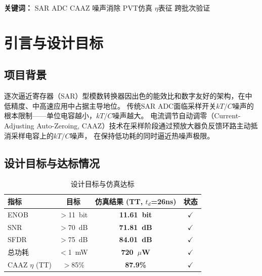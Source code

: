 \documentclass[11pt,a4paper,UTF8]{ctexart}
\newcommand{\keydata}[1]{\textbf{\color{primaryblue}#1}}
\begin{document}
\begin{titlepage}
\begin{center}
\vfill
{\small\textbf{关键词：} SAR ADC \hspace{1em} CAAZ \hspace{1em} 噪声消除 \hspace{1em} PVT仿真 \hspace{1em} $\eta$表征 \hspace{1em} 跨批次验证}
\end{center}
\end{titlepage}

\tableofcontents
\newpage

\section{引言与设计目标}
\label{sec:intro}

\subsection{项目背景}

逐次逼近寄存器（SAR）型模数转换器因出色的能效比和数字友好的架构，在中低精度、中高速应用中占据主导地位。
传统SAR ADC面临采样开关$kT/C$噪声的根本限制——单位电容越小，$kT/C$噪声越大。
电流调节自动调零（Current-Adjusting Auto-Zeroing, CAAZ）技术在采样阶段通过预放大器负反馈环路主动抵消采样电容上的$kT/C$噪声，
在保持低功耗的同时逼近热噪声极限。

\subsection{设计目标与达标情况}

\begin{table}[htbp]
\centering
\caption{设计目标与仿真达标}
\label{tab:targets}
\begin{tabular}{lccc}
\toprule
\textbf{指标} & \textbf{目标} & \textbf{仿真结果 (TT, $t_d$=26ns)} & \textbf{状态} \\
\midrule
ENOB & $>$11~bit & \keydata{11.61~bit} & $\checkmark$ \\
SNR & $>$70~dB & \keydata{71.81~dB} & $\checkmark$ \\
SFDR & $>$75~dB & \keydata{84.01~dB} & $\checkmark$ \\
总功耗 & $<$1~mW & \keydata{720~$\mu$W} & $\checkmark$ \\
CAAZ $\eta$ (TT) & $>$85\% & \keydata{87.9\%} & $\checkmark$ \\
\bottomrule
\end{tabular}
\end{table}
\end{document}
